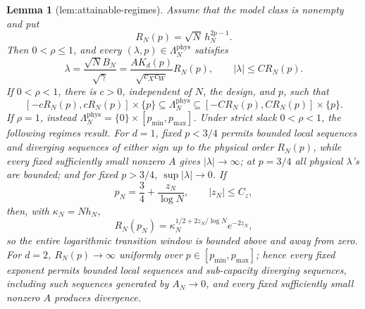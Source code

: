 \documentclass{article}
\newtheorem{lemma}{Lemma}
\begin{document}
\begin{lemma}[lem:attainable-regimes]\label{lem:attainable-regimes}
Assume that the model class is nonempty and put
\[
 R_N(p)=\sqrt N\,h_N^{2p-1}.
\]
Then \(0<\rho\le1\), and every \((\lambda,p)\in\Lambda_N^{\mathrm{phys}}\) satisfies
\[
 \lambda=\frac{\sqrt N B_N}{\sqrt\gamma}
 =\frac{A K_d(p)}{\sqrt{c_Xc_W}}R_N(p),
 \qquad |\lambda|\le C R_N(p).
\]
If \(0<\rho<1\), there is \(c>0\), independent of \(N\), the design, and \(p\), such that
\[
 [-cR_N(p),cR_N(p)]\times\{p\}
 \subseteq\Lambda_N^{\mathrm{phys}}
 \subseteq[-CR_N(p),CR_N(p)]\times\{p\}.
\]
If \(\rho=1\), instead \(\Lambda_N^{\mathrm{phys}}=\{0\}\times[p_{\min},p_{\max}]\).  Under strict slack \(0<\rho<1\), the following regimes result.  For \(d=1\), fixed \(p<3/4\) permits bounded local sequences and diverging sequences of either sign up to the physical order \(R_N(p)\), while every fixed sufficiently small nonzero \(A\) gives \(|\lambda|\to\infty\); at \(p=3/4\) all physical \(\lambda\)'s are bounded; and for fixed \(p>3/4\), \(\sup|\lambda|\to0\).  If
\[
 p_N=\frac34+\frac{z_N}{\log N},\qquad |z_N|\le C_z,
\]
then, with \(\kappa_N=Nh_N\),
\[
 R_N(p_N)=\kappa_N^{1/2+2z_N/\log N}e^{-2z_N},
\]
so the entire logarithmic transition window is bounded above and away from zero.  For \(d=2\), \(R_N(p)\to\infty\) uniformly over \(p\in[p_{\min},p_{\max}]\); hence every fixed exponent permits bounded local sequences and sub-capacity diverging sequences, including such sequences generated by \(A_N\to0\), and every fixed sufficiently small nonzero \(A\) produces divergence.
\end{lemma}
\end{document}
